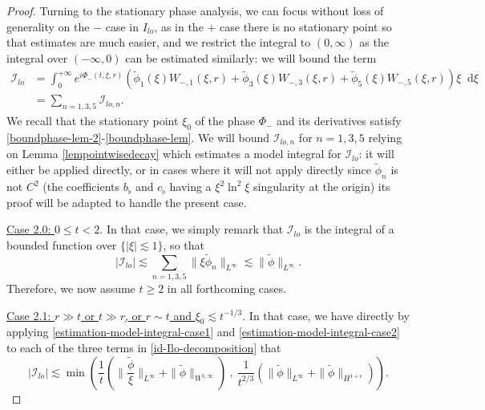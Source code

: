 \documentclass[11 pt]{amsart}
\theoremstyle{definition}
\theoremstyle{remark}
\numberwithin{equation}{section}
\newcommand{\dd}{\mathop{}\!\mathrm{d}}
\begin{document}
\begin{proof}
Turning to the stationary phase analysis, we can focus without loss of generality on the $-$ case in $I_{lo}$, as in the $+$ case there is no stationary point so that estimates are much easier, and we restrict the integral to $(0,\infty)$ as the integral over $(-\infty,0)$ can be estimated similarly: we will bound the term
\begin{align} \label{id-Ilo-decomposition}
\mathcal{I}_{lo} & = \int_{0}^{+\infty} e^{i \Phi_{-}(t,\xi,r)}( \widetilde{\phi}_1(\xi) W_{-,1}(\xi,r)+\widetilde{\phi}_3(\xi) W_{-,3}(\xi,r) +\widetilde{\phi}_5(\xi) W_{-,5}(\xi,r)  )\xi \dd \xi \\
\nonumber &=\sum_{n=1,3,5} \mathcal{I}_{lo,n}.
\end{align}
We recall that the stationary point $\xi_0$ of the phase $\Phi_-$ and its derivatives satisfy \eqref{boundphase-lem-2}-\eqref{boundphase-lem}. We will bound $\mathcal{I}_{lo,n}$ for $n=1,3,5$ relying on Lemma \ref{lempointwisedecay} which estimates a model integral for $\mathcal I_{lo}$: it will either be applied directly, or in cases where it will not apply directly since $\tilde \phi_n$ is not $C^2$ (the coefficients $b_\flat$ and $c_\flat$ having a $\xi^2\ln^2\xi$ singularity at the origin) its proof will be adapted to handle the present case.

\medskip

\noindent \underline{Case 2.0: $0\leqslant t<2$}. In that case, we simply remark that $\mathcal{I}_{lo}$ is the integral of a bounded function over $\{|\xi|\lesssim 1\}$, so that
$$
|\mathcal{I}_{lo}|\lesssim \sum_{n=1,3,5} \| \xi \widetilde{\phi}_n \|_{L^\infty} \lesssim \| \widetilde{\phi}\|_{L^\infty}.
$$
Therefore, we now assume $t\geqslant 2$ in all forthcoming cases.

\medskip

\noindent \underline{Case 2.1: $r \gg t$ or $t \gg r$, or $r \sim t$ and $\xi_0 \lesssim t^{-1/3}$}. In that case, we have directly by applying  \eqref{estimation-model-integral-case1} and \eqref{estimation-model-integral-case2} to each of the three terms in \eqref{id-Ilo-decomposition} that
$$
|\mathcal{I}_{lo} |\lesssim \min \left( \frac{1}{t}\left( \| \frac{\widetilde{\phi}}{\xi} \|_{L^\infty} + \|  \widetilde{\phi} \|_{W^{1,\infty}} \right) \ , \ \frac{1}{t^{2/3}}\left( \|  \widetilde{\phi} \|_{L^\infty} + \|  \widetilde{\phi} \|_{H^{1+\epsilon}} \right) \right).
$$

\medskip


\end{proof}
\end{document}
